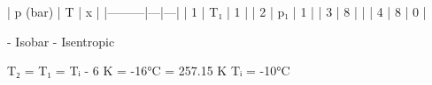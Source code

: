 | p (bar) | T | x |
|---------|---|---|
| 1       | T₁ | 1 |
| 2       | p₁ | 1 |
| 3       | 8   |   |
| 4       | 8   | 0 |

- Isobar
- Isentropic

T₂ = T₁ = Tᵢ - 6 K = -16°C = 257.15 K  
Tᵢ = -10°C